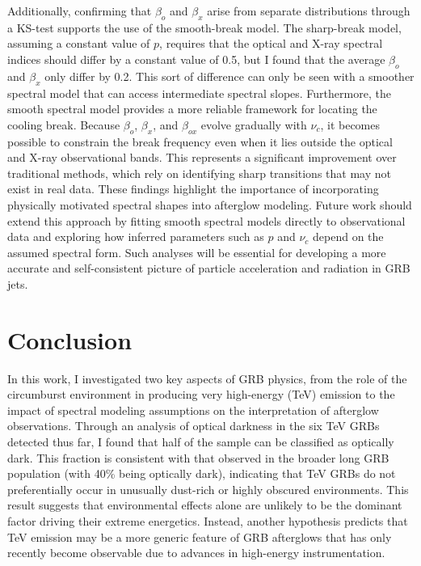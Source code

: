 \documentclass{article}
\begin{document}
Additionally, confirming that $\beta_o$ and $\beta_x$ arise from separate distributions through a KS-test supports the use of the smooth-break model. The sharp-break model, assuming a constant value of $p$, requires that the optical and X-ray spectral indices should differ by a constant value of 0.5, but I found that the average $\beta_o$ and $\beta_x$ only differ by 0.2. This sort of difference can only be seen with a smoother spectral model that can access intermediate spectral slopes. Furthermore, the smooth spectral model provides a more reliable framework for locating the cooling break. Because $\beta_o$, $\beta_x$, and $\beta_{ox}$ evolve gradually with $\nu_c$, it becomes possible to constrain the break frequency even when it lies outside the optical and X-ray observational bands. This represents a significant improvement over traditional methods, which rely on identifying sharp transitions that may not exist in real data. These findings highlight the importance of incorporating physically motivated spectral shapes into afterglow modeling. Future work should extend this approach by fitting smooth spectral models directly to observational data and exploring how inferred parameters such as $p$ and $\nu_c$ depend on the assumed spectral form. Such analyses will be essential for developing a more accurate and self-consistent picture of particle acceleration and radiation in GRB jets. 



\section{Conclusion}

In this work, I investigated two key aspects of GRB physics, from the role of the circumburst environment in producing very high-energy (TeV) emission to the impact of spectral modeling assumptions on the interpretation of afterglow observations. Through an analysis of optical darkness in the six TeV GRBs detected thus far, I found that half of the sample can be classified as optically dark. This fraction is consistent with that observed in the broader long GRB population (with 40\% being optically dark), indicating that TeV GRBs do not preferentially occur in unusually dust-rich or highly obscured environments. This result suggests that environmental effects alone are unlikely to be the dominant factor driving their extreme energetics. Instead, another hypothesis predicts that TeV emission may be a more generic feature of GRB afterglows that has only recently become observable due to advances in high-energy instrumentation.
\end{document}
